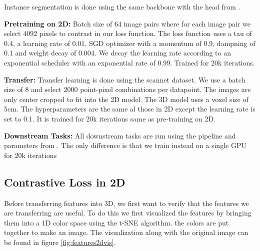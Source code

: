 \documentclass[10pt,twocolumn,letterpaper]{article}
\newcommand{\AJ}[1]{{\color{red}{[Andrej: #1]}}}
\begin{document}
Instance segmentation is done using the same backbone with the head from \cite{jiang2020pointgroup}.

\textbf{Pretraining on 2D:} Batch size of 64 image pairs where for each image pair we select 4092 pixels to contrast in our loss function. The loss function uses a tau of 0.4, a learning rate of 0.01, SGD optimizer with a momentum of 0.9, dampning of 0.1 and weight decay of 0.004. We decay the learning rate according to an exponential scheduler with an exponential rate of 0.99. Trained for 20k iterations.

\textbf{Transfer:} Transfer learning is done using the scannet dataset. We use a batch size of 8 and select 2000 point-pixel combinations per datapoint. The images are only center cropped to fit into the 2D model. The 3D model uses a voxel size of 5cm. The hyperparameters are the same al those in 2D except the learning rate is set to 0.1. It is trained for 20k iterations same as pre-training on 2D.

\textbf{Downstream Tasks:} All downstream tasks are run using the pipeline and parameters from \cite{hou2021Exploring}. The only difference is that we train instead on a single GPU for 20k iterations

\subsection{Contrastive Loss in 2D}
\label{sec:results:2d}

Before transferring features into 3D, we first want to verify that the features we are transferring are useful. To do this we first visualized the features by bringing them into a 1D color space using the t-SNE \cite{maaten2008Visualizing} algorithm. the colors are put together to make an image. The visualization along with the original image can be found in figure \ref{fig:features2dvis}.

\AJ{Need to train a 2D segmentation with and without pre-training.}
\end{document}
